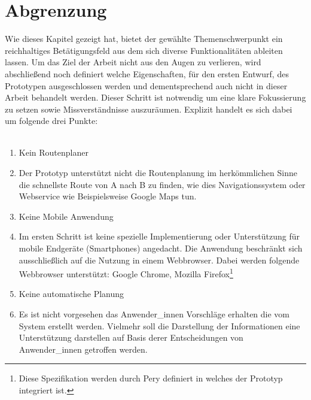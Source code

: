\documentclass[Bachelorarbeit.tex]{subfiles}
\begin{document}
\section{Abgrenzung}
Wie dieses Kapitel gezeigt hat, bietet der gewählte Themenschwerpunkt ein reichhaltiges Betätigungsfeld aus dem sich diverse Funktionalitäten ableiten lassen. 
Um das Ziel der Arbeit nicht aus den Augen zu verlieren, wird abschließend noch definiert welche Eigenschaften, für den ersten Entwurf, des Prototypen ausgeschlossen werden und dementsprechend auch nicht in dieser Arbeit behandelt werden. 
Dieser Schritt ist notwendig um eine klare Fokussierung zu setzen sowie Missverständnisse auszuräumen.
Explizit handelt es sich dabei um folgende drei Punkte:\\
\\
\begin{enumerate}
	\item Kein Routenplaner
	\item[] Der Prototyp unterstützt nicht die Routenplanung im herkömmlichen Sinne die schnellste Route von A nach B zu finden, wie dies Navigationssystem oder Webservice wie Beispielsweise Google Maps tun.
	\item Keine Mobile Anwendung
	\item [] Im ersten Schritt ist keine spezielle Implementierung oder Unterstützung für mobile Endgeräte (Smartphones) angedacht. Die Anwendung beschränkt sich ausschließlich auf die Nutzung in einem Webbrowser. Dabei werden folgende Webbrowser unterstützt: Google Chrome, Mozilla Firefox\footnote{Diese Spezifikation werden durch Pery definiert in welches der Prototyp integriert ist.}
	\item Keine automatische Planung
	\item[] Es ist nicht vorgesehen das Anwender\_innen Vorschläge erhalten die vom System erstellt werden. Vielmehr soll die Darstellung der Informationen eine Unterstützung darstellen auf Basis derer Entscheidungen von Anwender\_innen getroffen werden.
\end{enumerate}
\end{document}
